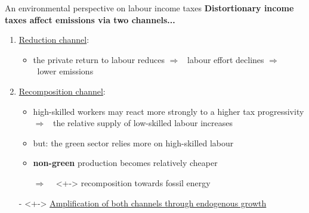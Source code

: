 \documentclass[11pt,aspectratio=169]{beamer}
\newcommand{\ar}{$\Rightarrow$ \ }
\begin{document}
\begin{frame}{An environmental perspective on labour income taxes}
	\pause
\alert{\textbf{Distortionary income taxes affect emissions via two channels...}}
\pause
\vspace{4mm}
\begin{enumerate}
	\item<+-> \underline{Reduction channel}: 
	\vspace{2mm}
	\begin{itemize}
		\item<+-> the private return to labour reduces \ar labour effort declines \ar lower emissions %
	\end{itemize}
\vspace{3mm}
	\item<+-> \underline{Recomposition channel}:
		\vspace{2mm}
	\begin{itemize}
		\item<+->  high-skilled workers may react more strongly to a higher tax progressivity \\ \ar the relative supply of low-skilled labour increases
		\item<+-> but: the green sector relies more on high-skilled labour \citep{Consoli2016DoCapital}
		\item<+-> \textbf{non-green} production becomes relatively cheaper 
		\item[\ar]<+-> recomposition towards fossil energy
	\end{itemize}
\vspace{3mm}
\item[-]<+-> \underline{Amplification of both channels through endogenous growth}
\end{enumerate}
\end{frame}
\end{document}
